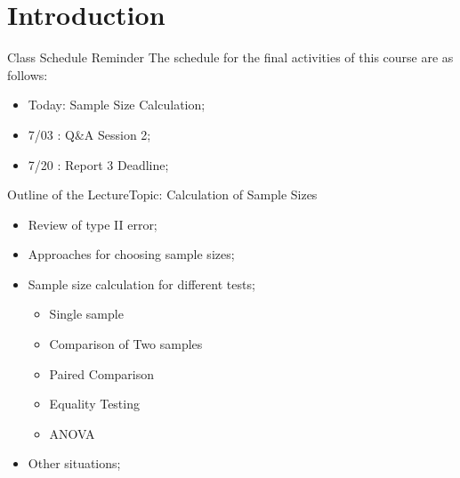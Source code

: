 \section{Introduction}

\begin{frame}{Class Schedule Reminder}
  The schedule for the final activities of this course are as follows:
  \bigskip

  \begin{itemize}
    \item Today: Sample Size Calculation;\bigskip

    \item 7/03 : Q\&A Session 2;\bigskip

    \item 7/20 : Report 3 Deadline;\bigskip
  \end{itemize}
\end{frame}

\begin{frame}{Outline of the Lecture}{Topic: Calculation of Sample Sizes}

  \begin{itemize}
    \item Review of type II error;\medskip
    \item Approaches for choosing sample sizes;\medskip
    \item Sample size calculation for different tests;
    \begin{itemize}
      \item Single sample
      \item Comparison of Two samples
      \item Paired Comparison
      \item Equality Testing
      \item ANOVA
    \end{itemize}\medskip
    \item Other situations;
  \end{itemize}
\end{frame}
